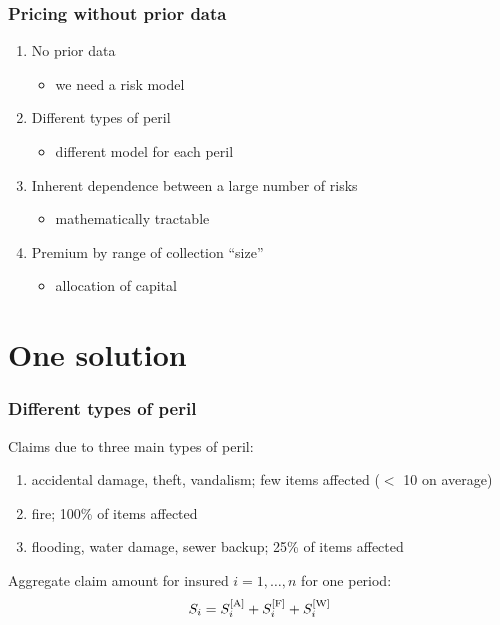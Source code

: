 \begin{frame}
  \frametitle{Pricing without prior data}

  \begin{enumerate}
  \item No prior data
    \begin{itemize}
    \item we need a risk model
    \end{itemize}
    \medskip
  \item Different types of peril
    \begin{itemize}
    \item different model for each peril
    \end{itemize}
    \medskip
  \item Inherent dependence between a large number of risks
    \begin{itemize}
    \item mathematically tractable
    \end{itemize}
    \medskip
  \item Premium by range of collection ``size''
    \begin{itemize}
    \item allocation of capital
    \end{itemize}
  \end{enumerate}
\end{frame}

\section{One solution}

\begin{frame}
  \frametitle{Different types of peril}

  \begin{assumption}
    Claims due to three main types of peril:
    \begin{enumerate}
    \item accidental damage, theft, vandalism; \alert{few} items affected ($<$ 10 on average)
    \item fire; \alert{100\%} of items affected
    \item flooding, water damage, sewer backup; \alert{25\%} of items
      affected
    \end{enumerate}
  \end{assumption}
  \pause

  \begin{consequence}
    Aggregate claim amount for insured $i = 1, \dots, n$ for one period:
    \begin{equation*}
      S_i = S_i^{[\text{A}]} + S_i^{[\text{F}]} + S_i^{[\text{W}]}
    \end{equation*}
  \end{consequence}
\end{frame}

